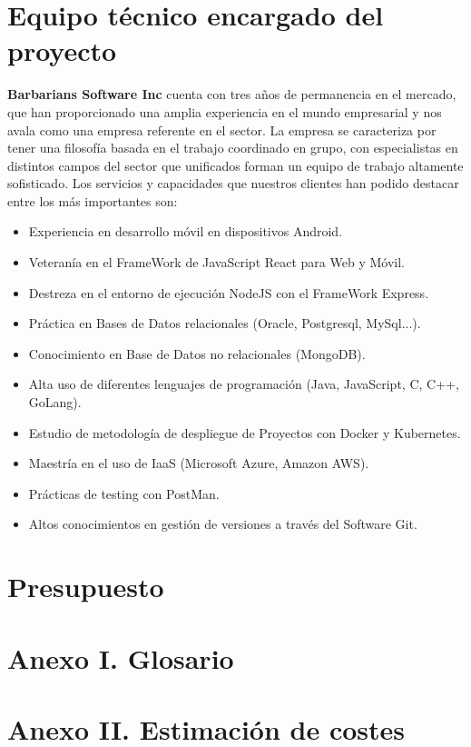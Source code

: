 \documentclass{article}
\begin{document}
\section{Equipo técnico encargado del proyecto}

\textbf{Barbarians Software Inc} cuenta con tres años de permanencia en el mercado, que han proporcionado una amplia experiencia en el mundo empresarial y nos avala como una empresa referente en el sector. La empresa se caracteriza por tener una filosofía basada en el trabajo coordinado en grupo, con especialistas en distintos campos del sector que unificados forman un equipo de trabajo altamente sofisticado.
Los servicios y capacidades que nuestros clientes han podido destacar entre los más importantes son:
\begin{itemize}
   \item Experiencia en desarrollo móvil en dispositivos Android.
   \item Veteranía en el FrameWork de JavaScript React para Web y Móvil.
   \item Destreza en el entorno de ejecución NodeJS con el FrameWork Express.
   \item Práctica en Bases de Datos relacionales (Oracle, Postgresql, MySql...).
   \item Conocimiento en Base de Datos no relacionales (MongoDB).
   \item Alta uso de diferentes lenguajes de programación (Java, JavaScript, C, C++, GoLang).
   \item Estudio de metodología de despliegue de Proyectos con Docker y Kubernetes.
   \item Maestría en el uso de IaaS (Microsoft Azure, Amazon AWS).
   \item Prácticas de testing con PostMan.
   \item Altos conocimientos en gestión de versiones a través del Software Git.
\end{itemize}

\section{Presupuesto}

\section*{Anexo I. Glosario}

\section*{Anexo II. Estimación de costes}

\end{document}
